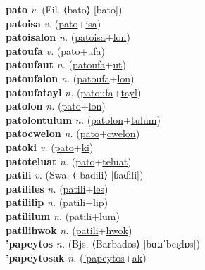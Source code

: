 \textbf{pato} \textit{v.} (Fil. ⟨bato⟩ [bato])
 \label{pato} \\
\textbf{patoisa} \textit{v.} (\hyperref[pato]{pato}+\hyperref[isa]{isa})
 \label{patoisa} \\
\textbf{patoisalon} \textit{n.} (\hyperref[patoisa]{patoisa}+\hyperref[lon]{lon})
 \label{patoisalon} \\
\textbf{patoufa} \textit{v.} (\hyperref[pato]{pato}+\hyperref[ufa]{ufa})
 \label{patoufa} \\
\textbf{patoufaut} \textit{n.} (\hyperref[patoufa]{patoufa}+\hyperref[ut]{ut})
 \label{patoufaut} \\
\textbf{patoufalon} \textit{n.} (\hyperref[patoufa]{patoufa}+\hyperref[lon]{lon})
 \label{patoufalon} \\
\textbf{patoufatayl} \textit{n.} (\hyperref[patoufa]{patoufa}+\hyperref[tayl]{tayl})
 \label{patoufatayl} \\
\textbf{patolon} \textit{n.} (\hyperref[pato]{pato}+\hyperref[lon]{lon})
 \label{patolon} \\
\textbf{patolontulum} \textit{n.} (\hyperref[patolon]{patolon}+\hyperref[tulum]{tulum})
 \label{patolontulum} \\
\textbf{patocwelon} \textit{n.} (\hyperref[pato]{pato}+\hyperref[cwelon]{cwelon})
 \label{patocwelon} \\
\textbf{patoki} \textit{v.} (\hyperref[pato]{pato}+\hyperref[ki]{ki})
 \label{patoki} \\
\textbf{patoteluat} \textit{n.} (\hyperref[pato]{pato}+\hyperref[teluat]{teluat})
 \label{patoteluat} \\
\textbf{patili} \textit{v.} (Swa. ⟨-badili⟩ [ɓaɗili])
 \label{patili} \\
\textbf{patililes} \textit{n.} (\hyperref[patili]{patili}+\hyperref[les]{les})
 \label{patililes} \\
\textbf{patililip} \textit{n.} (\hyperref[patili]{patili}+\hyperref[lip]{lip})
 \label{patililip} \\
\textbf{patililum} \textit{n.} (\hyperref[patili]{patili}+\hyperref[lum]{lum})
 \label{patililum} \\
\textbf{patilihwok} \textit{n.} (\hyperref[patili]{patili}+\hyperref[hwok]{hwok})
 \label{patilihwok} \\
\textbf{'papeytos} \textit{n.} (Bjs. ⟨Barbados⟩ [bɑːɹˈbeɪ̯dɒs])
 \label{'papeytos} \\
\textbf{'papeytosak} \textit{n.} (\hyperref['papeytos]{'papeytos}+\hyperref[ak]{ak})
 \label{'papeytosak} \\

